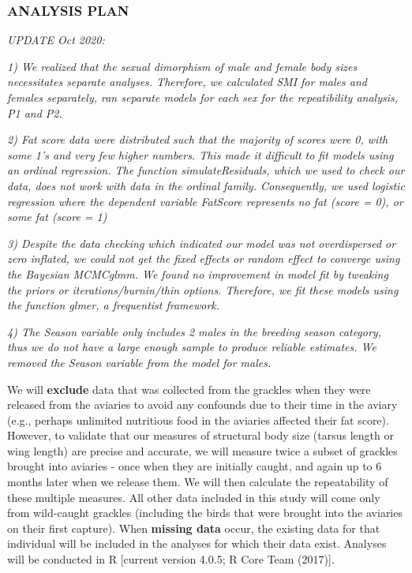 \documentclass[
]{article}
\begin{document}
\hypertarget{analysis-plan}{%
\subsubsection{ANALYSIS PLAN}\label{analysis-plan}}

\emph{UPDATE Oct 2020:}

\emph{1) We realized that the sexual dimorphism of male and female body
sizes necessitates separate analyses. Therefore, we calculated SMI for
males and females separately, ran separate models for each sex for the
repeatibility analysis, P1 and P2.}

\emph{2) Fat score data were distributed such that the majority of
scores were 0, with some 1's and very few higher numbers. This made it
difficult to fit models using an ordinal regression. The function
simulateResiduals, which we used to check our data, does not work with
data in the ordinal family. Consequently, we used logistic regression
where the dependent variable FatScore represents no fat (score = 0), or
some fat (score = 1)}

\emph{3) Despite the data checking which indicated our model was not
overdispersed or zero inflated, we could not get the fixed effects or
random effect to converge using the Bayesian MCMCglmm. We found no
improvement in model fit by tweaking the priors or
iterations/burnin/thin options. Therefore, we fit these models using the
function glmer, a frequentist framework.}

\emph{4) The Season variable only includes 2 males in the breeding
season category, thus we do not have a large enough sample to produce
reliable estimates. We removed the Season variable from the model for
males.}

We will \textbf{exclude} data that was collected from the grackles when
they were released from the aviaries to avoid any confounds due to their
time in the aviary (e.g., perhaps unlimited nutritious food in the
aviaries affected their fat score). However, to validate that our
measures of structural body size (tarsus length or wing length) are
precise and accurate, we will measure twice a subset of grackles brought
into aviaries - once when they are initially caught, and again up to 6
months later when we release them. We will then calculate the
repeatability of these multiple measures. All other data included in
this study will come only from wild-caught grackles (including the birds
that were brought into the aviaries on their first capture). When
\textbf{missing data} occur, the existing data for that individual will
be included in the analyses for which their data exist. Analyses will be
conducted in R {[}current version 4.0.5; R Core Team (2017){]}.
\end{document}
